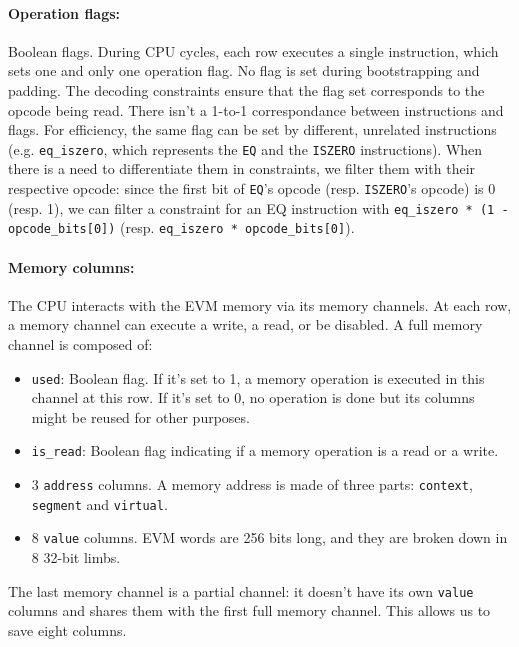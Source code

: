 \paragraph*{Operation flags:} Boolean flags. During CPU cycles, each row executes a single instruction, which sets one and only one operation flag. No flag is set during
bootstrapping and padding. The decoding constraints ensure that the flag set corresponds to the opcode being read.
There isn't a 1-to-1 correspondance between instructions and flags. For efficiency, the same flag can be set by different, unrelated instructions (e.g. \texttt{eq\_iszero}, which represents
the \texttt{EQ} and the \texttt{ISZERO} instructions). When there is a need to differentiate them in constraints, we filter them with their respective opcode: since the first bit of \texttt{EQ}'s opcode
(resp. \texttt{ISZERO}'s opcode) is 0 (resp. 1), we can filter a constraint for an EQ instruction with \texttt{eq\_iszero * (1 - opcode\_bits[0])}
(resp. \texttt{eq\_iszero * opcode\_bits[0]}).

\paragraph*{Memory columns:} The CPU interacts with the EVM memory via its memory channels. At each row, a memory channel can execute a write, a read, or be disabled. A full memory channel is composed of:
\begin{itemize}
    \item  \texttt{used}: Boolean flag. If it's set to 1, a memory operation is executed in this channel at this row. If it's set to 0, no operation is done but its columns might be reused for other purposes.
    \item  \texttt{is\_read}: Boolean flag indicating if a memory operation is a read or a write.
    \item  3 \texttt{address} columns. A memory address is made of three parts: \texttt{context}, \texttt{segment} and \texttt{virtual}.
    \item  8 \texttt{value} columns. EVM words are 256 bits long, and they are broken down in 8 32-bit limbs.
\end{itemize}
The last memory channel is a partial channel: it doesn't have its own \texttt{value} columns and shares them with the first full memory channel. This allows us to save eight columns.


